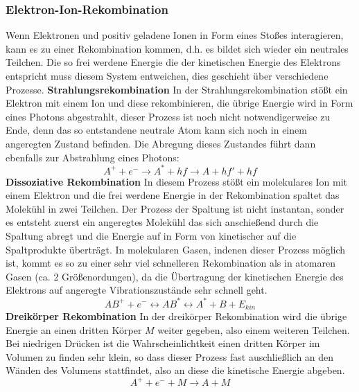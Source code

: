 \subsubsection{Elektron-Ion-Rekombination}
Wenn Elektronen und positiv geladene Ionen in Form eines Stoßes interagieren, kann es zu einer Rekombination kommen, d.h. es bildet sich wieder ein neutrales Teilchen. Die so frei werdene Energie die der kinetischen Energie des Elektrons entspricht muss diesem System entweichen, dies geschieht über verschiedene Prozesse.\newline\newline
\textbf{Strahlungsrekombination}
In der Strahlungsrekombination stößt ein Elektron mit einem Ion und diese rekombinieren, die übrige Energie wird in Form eines Photons abgestrahlt, dieser Prozess ist noch nicht notwendigerweise zu Ende, denn das so entstandene neutrale Atom kann sich noch in einem angeregten Zustand befinden. Die Abregung dieses Zustandes führt dann ebenfalls zur Abstrahlung eines Photons:
\begin{equation}
    A^+ + e^- \rightarrow A^* + hf \rightarrow A + hf' + hf
    \label{eq:radiationrecombination}
\end{equation}\newline
\textbf{Dissoziative Rekombination}
In diesem Prozess stößt ein molekulares Ion mit einem Elektron und die frei werdene Energie in der Rekombination spaltet das Molekühl in zwei Teilchen. Der Prozess der Spaltung ist nicht instantan, sonder es entsteht zuerst ein angeregtes Molekühl das sich anschießend durch die Spaltung abregt und die Energie auf in Form von kinetischer auf die Spaltprodukte überträgt. In molekularen Gasen, indenen dieser Prozess möglich ist, kommt es so zu einer sehr viel schnelleren Rekombination als in atomaren Gasen (ca. 2 Größenordungen), da die Übertragung der kinetischen Energie des Elektrons auf angeregte Vibrationszustände sehr schnell geht.
\begin{equation}
    AB^+ + e^- \leftrightarrow AB^* \leftrightarrow A^* + B + E_{kin}
\end{equation}\newline
\textbf{Dreikörper Rekombination}
In der dreikörper Rekombination wird die übrige Energie an einen dritten Körper \(M\) weiter gegeben, also einem weiteren Teilchen. Bei niedrigen Drücken ist die Wahrscheinlichtkeit einen dritten Körper im Volumen zu finden sehr klein, so dass dieser Prozess fast auschließlich an den Wänden des Volumens stattfindet, also an diese die kinetische Energie abgeben.
\begin{equation}
    A^+ + e^- + M \rightarrow A + M
\end{equation}

